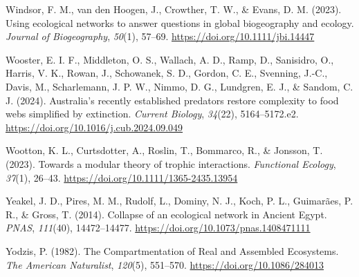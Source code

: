 \documentclass[
]{article}
\newlength{\cslhangindent}
\newenvironment{CSLReferences}[2] %
 {\begin{list}{}{%
  \setlength{\itemindent}{0pt}
  \setlength{\leftmargin}{0pt}
  \setlength{\parsep}{0pt}
  \ifodd #1
   \setlength{\leftmargin}{\cslhangindent}
   \setlength{\itemindent}{-1\cslhangindent}
  \fi
  \setlength{\itemsep}{#2\baselineskip}}}
 {\end{list}}
\begin{document}
\begin{CSLReferences}{1}{0}
Windsor, F. M., van den Hoogen, J., Crowther, T. W., \& Evans, D. M.
(2023). Using ecological networks to answer questions in global
biogeography and ecology. \emph{Journal of Biogeography}, \emph{50}(1),
57--69. \url{https://doi.org/10.1111/jbi.14447}

Wooster, E. I. F., Middleton, O. S., Wallach, A. D., Ramp, D.,
Sanisidro, O., Harris, V. K., Rowan, J., Schowanek, S. D., Gordon, C.
E., Svenning, J.-C., Davis, M., Scharlemann, J. P. W., Nimmo, D. G.,
Lundgren, E. J., \& Sandom, C. J. (2024). Australia's recently
established predators restore complexity to food webs simplified by
extinction. \emph{Current Biology}, \emph{34}(22), 5164--5172.e2.
\url{https://doi.org/10.1016/j.cub.2024.09.049}

Wootton, K. L., Curtsdotter, A., Roslin, T., Bommarco, R., \& Jonsson,
T. (2023). Towards a modular theory of trophic interactions.
\emph{Functional Ecology}, \emph{37}(1), 26--43.
\url{https://doi.org/10.1111/1365-2435.13954}

Yeakel, J. D., Pires, M. M., Rudolf, L., Dominy, N. J., Koch, P. L.,
Guimarães, P. R., \& Gross, T. (2014). Collapse of an ecological network
in {Ancient Egypt}. \emph{PNAS}, \emph{111}(40), 14472--14477.
\url{https://doi.org/10.1073/pnas.1408471111}

Yodzis, P. (1982). The {Compartmentation} of {Real} and {Assembled
Ecosystems}. \emph{The American Naturalist}, \emph{120}(5), 551--570.
\url{https://doi.org/10.1086/284013}

\end{CSLReferences}
\end{document}
